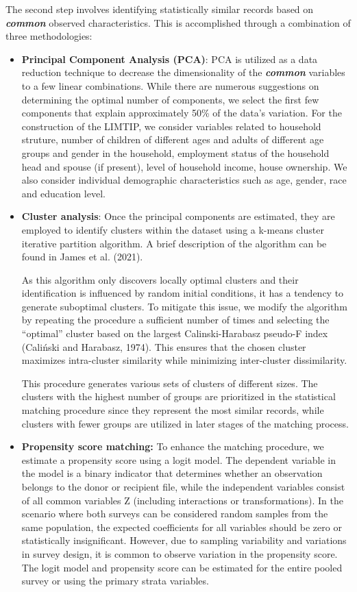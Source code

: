 \documentclass[
  11pt,
]{article}
\begin{document}
The second step involves identifying statistically similar records based
on \textbf{\emph{common}} observed characteristics. This is accomplished
through a combination of three methodologies:

\begin{itemize}
\item
  \textbf{Principal Component Analysis (PCA)}: PCA is utilized as a data
  reduction technique to decrease the dimensionality of the
  \textbf{\emph{common}} variables to a few linear combinations. While
  there are numerous suggestions on determining the optimal number of
  components, we select the first few components that explain
  approximately 50\% of the data's variation. For the construction of
  the LIMTIP, we consider variables related to household struture,
  number of children of different ages and adults of different age
  groups and gender in the household, employment status of the household
  head and spouse (if present), level of household income, house
  ownership. We also consider individual demographic characteristics
  such as age, gender, race and education level.
\item
  \textbf{Cluster analysis}: Once the principal components are
  estimated, they are employed to identify clusters within the dataset
  using a k-means cluster iterative partition algorithm. A brief
  description of the algorithm can be found in James et al. (2021).

  As this algorithm only discovers locally optimal clusters and their
  identification is influenced by random initial conditions, it has a
  tendency to generate suboptimal clusters. To mitigate this issue, we
  modify the algorithm by repeating the procedure a sufficient number of
  times and selecting the ``optimal'' cluster based on the largest
  Calinski-Harabasz pseudo-F index (Caliński and Harabasz, 1974). This
  ensures that the chosen cluster maximizes intra-cluster similarity
  while minimizing inter-cluster dissimilarity.

  This procedure generates various sets of clusters of different sizes.
  The clusters with the highest number of groups are prioritized in the
  statistical matching procedure since they represent the most similar
  records, while clusters with fewer groups are utilized in later stages
  of the matching process.
\item
  \textbf{Propensity score matching:} To enhance the matching procedure,
  we estimate a propensity score using a logit model. The dependent
  variable in the model is a binary indicator that determines whether an
  observation belongs to the donor or recipient file, while the
  independent variables consist of all common variables Z (including
  interactions or transformations). In the scenario where both surveys
  can be considered random samples from the same population, the
  expected coefficients for all variables should be zero or
  statistically insignificant. However, due to sampling variability and
  variations in survey design, it is common to observe variation in the
  propensity score. The logit model and propensity score can be
  estimated for the entire pooled survey or using the primary strata
  variables.
\end{itemize}
\end{document}

